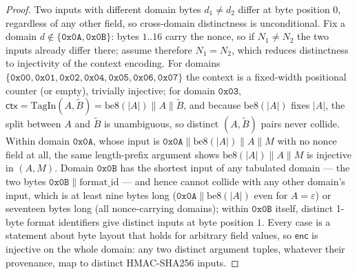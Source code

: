 \documentclass[11pt,a4paper]{article}
\begin{document}
\begin{proof}
Two inputs with different domain bytes $d_1\neq d_2$ differ at byte
position $0$, regardless of any other field, so cross-domain distinctness
is unconditional. Fix a domain $d\notin\{\texttt{0x0A},\texttt{0x0B}\}$:
bytes $1..16$ carry the nonce, so if $N_1\neq N_2$ the two inputs already
differ there; assume therefore $N_1=N_2$, which reduces distinctness to
injectivity of the context encoding. For domains
$\{\texttt{0x00},\texttt{0x01},\texttt{0x02},\texttt{0x04},\texttt{0x05},\texttt{0x06},\texttt{0x07}\}$
the context is a fixed-width positional counter (or empty), trivially
injective;
for domain $\texttt{0x03}$, $\mathsf{ctx}=\mathrm{TagIn}(A,\widetilde{B})=\mathrm{be8}(|A|)\|A\|\widetilde{B}$,
and because $\mathrm{be8}(|A|)$ fixes $|A|$, the split between $A$ and
$\widetilde{B}$ is unambiguous, so distinct $(A,\widetilde{B})$ pairs never
collide. Within domain $\texttt{0x0A}$, whose input is
$\texttt{0x0A}\|\mathrm{be8}(|A|)\|A\|M$ with no nonce field at all, the
same length-prefix argument shows $\mathrm{be8}(|A|)\|A\|M$ is injective in
$(A,M)$. Domain $\texttt{0x0B}$ has the shortest input of any tabulated
domain — the two bytes $\texttt{0x0B}\|\mathrm{format\_id}$ — and hence
cannot collide with any other domain's input, which is at least nine
bytes long ($\texttt{0x0A}\|\mathrm{be8}(|A|)$ even for $A=\varepsilon$)
or seventeen bytes long (all nonce-carrying domains); within
$\texttt{0x0B}$ itself, distinct 1-byte format identifiers give distinct
inputs at byte position $1$. Every case is a statement about byte layout
that holds for arbitrary field values, so $\mathsf{enc}$ is injective on
the whole domain: any two distinct argument tuples, whatever their
provenance, map to distinct HMAC-SHA256 inputs.
\end{proof}
\end{document}
